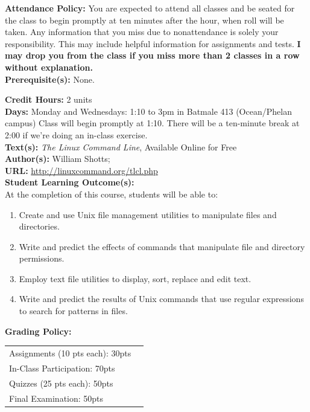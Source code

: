 \documentclass[11pt]{article}
\begin{document}
\textbf {Attendance Policy:} You are expected to attend all classes and be
seated for the class to begin promptly at ten minutes after the hour, when roll
will be taken. Any information
that you miss due to nonattendance is solely your responsibility. This may
include helpful information for assignments and tests. {\bf I may drop you from
the class if you miss more than 2 classes in a row without explanation.}\\

\textbf {Prerequisite(s):} None.

\textbf {Credit Hours:} 2 units\\
\textbf {Days:} Monday and Wednesdays: 1:10 to 3pm in Batmale 413 (Ocean/Phelan campus)
Class will begin promptly at 1:10. There will be a ten-minute break at 2:00 if we're doing an in-class exercise.\\
\textbf {\large Text(s):} \emph{The Linux Command Line}, Available Online for Free\\
\textbf {Author(s):} William Shotts;\\
\textbf {URL:} \url{http://linuxcommand.org/tlcl.php} \\

\textbf {\large Student Learning Outcome(s):} \\
At the completion of this course, students will be able to:
\begin{enumerate} \itemsep-0.4em
  \item Create and use Unix file management utilities to manipulate files and directories.
  \item Write and predict the effects of commands that manipulate file and directory permissions.
  \item Employ text file utilities to display, sort, replace and edit text.
  \item Write and predict the results of Unix commands that use regular expressions to search for patterns in files.
\end{enumerate}

\textbf {\large Grading Policy:} \\
\hspace*{40mm}
\begin{tabular}{ l l }
  Assignments (10 pts each): 30pts \\
  In-Class Participation: 70pts \\
  Quizzes (25 pts each): 50pts \\
  Final Examination: 50pts \\
\end{tabular} \\\\
\end{document}
